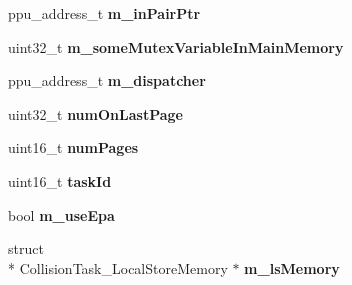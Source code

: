 \begin{DoxyCompactItemize}
\item 
\hypertarget{struct_spu_gather_and_process_pairs_task_desc_a44e209cf8fb7555571d0aa9ad2f48e97}{ppu\+\_\+address\+\_\+t {\bfseries m\+\_\+in\+Pair\+Ptr}}\label{struct_spu_gather_and_process_pairs_task_desc_a44e209cf8fb7555571d0aa9ad2f48e97}

\item 
\hypertarget{struct_spu_gather_and_process_pairs_task_desc_abf800c4cbc0891c59e71f407f9fae957}{uint32\+\_\+t {\bfseries m\+\_\+some\+Mutex\+Variable\+In\+Main\+Memory}}\label{struct_spu_gather_and_process_pairs_task_desc_abf800c4cbc0891c59e71f407f9fae957}

\item 
\hypertarget{struct_spu_gather_and_process_pairs_task_desc_af66f9618c780454af54ac9e235b7eab1}{ppu\+\_\+address\+\_\+t {\bfseries m\+\_\+dispatcher}}\label{struct_spu_gather_and_process_pairs_task_desc_af66f9618c780454af54ac9e235b7eab1}

\item 
\hypertarget{struct_spu_gather_and_process_pairs_task_desc_ac5830645b4d3965a60cc8b8c844588e3}{uint32\+\_\+t {\bfseries num\+On\+Last\+Page}}\label{struct_spu_gather_and_process_pairs_task_desc_ac5830645b4d3965a60cc8b8c844588e3}

\item 
\hypertarget{struct_spu_gather_and_process_pairs_task_desc_aa85f2b591db679b9aa08fd68b75a4ec3}{uint16\+\_\+t {\bfseries num\+Pages}}\label{struct_spu_gather_and_process_pairs_task_desc_aa85f2b591db679b9aa08fd68b75a4ec3}

\item 
\hypertarget{struct_spu_gather_and_process_pairs_task_desc_a6498084824c8578acee347e88478e147}{uint16\+\_\+t {\bfseries task\+Id}}\label{struct_spu_gather_and_process_pairs_task_desc_a6498084824c8578acee347e88478e147}

\item 
\hypertarget{struct_spu_gather_and_process_pairs_task_desc_ae3863c304eba1ff806a476001c03ddfe}{bool {\bfseries m\+\_\+use\+Epa}}\label{struct_spu_gather_and_process_pairs_task_desc_ae3863c304eba1ff806a476001c03ddfe}

\item 
\hypertarget{struct_spu_gather_and_process_pairs_task_desc_a132e2d6b600f3f3ca1c3dd4bb8d8856c}{struct \\*
Collision\+Task\+\_\+\+Local\+Store\+Memory $\ast$ {\bfseries m\+\_\+ls\+Memory}}\label{struct_spu_gather_and_process_pairs_task_desc_a132e2d6b600f3f3ca1c3dd4bb8d8856c}

\end{DoxyCompactItemize}


